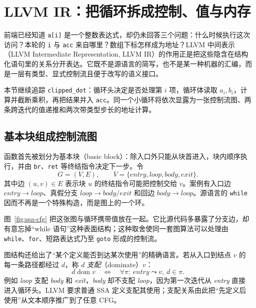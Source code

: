 \section{LLVM IR：把循环拆成控制、值与内存}
\label{sec:llvm-ir}

前端已经知道 \texttt{a[i]} 是一个整数表达式，却仍未回答三个问题：什么时候执行这次访问？本轮的 \texttt{i} 与 \texttt{acc} 来自哪里？数组下标怎样成为地址？LLVM 中间表示（LLVM Intermediate Representation, LLVM IR）的作用正是把这些隐含在结构化语句里的关系分开表达。它既不是源语言的简写，也不是某一种机器的汇编，而是一层有类型、显式控制流且便于改写的语义接口\cite{llvm-lattner2004,llvm-langref}。

本节继续追踪 \texttt{clipped\_dot}：循环头决定是否处理第 \(i\) 项，循环体读取 \(a_i,b_i\)，计算并截断乘积，再把结果并入 \texttt{acc}。同一个小循环将依次显露为一张控制流图、两条跨迭代的值递推和两次带类型步长的地址计算。

\subsection{基本块组成控制流图}

函数首先被划分为基本块（basic block）：除入口外只能从块首进入，块内顺序执行，并由 \texttt{br}、\texttt{ret} 等终结指令决定下一步。令
\[
  G=(V,E),\qquad
  V=\{\textit{entry},\textit{loop},\textit{body},\textit{exit}\}.
\]
其中边 \((u,v)\in E\) 表示块 \(u\) 的终结指令可能把控制交给 \(v\)。案例有入口边 \(entry\to loop\)、真假分支 \(loop\to body/exit\) 和回边 \(body\to loop\)。源语言的 \texttt{while} 因而不再是一个特殊构造，而是图上的一个环。

图~\ref{fig:ssa-cfg} 把这张图与循环携带值放在一起。它比源代码多暴露了分支边，却有意忘掉“while 语句”这种表面结构；这种取舍使同一套图算法可以处理由 \texttt{while}、\texttt{for}、短路表达式乃至 \texttt{goto} 形成的控制流。



图结构还给出了“某个定义能否到达某次使用”的精确语言。若从入口到结点 \(v\) 的每一条路径都经过 \(d\)，称 \(d\) \emph{支配}（dominate）\(v\)：
\begin{equation}
  d\mathrel{\operatorname{dom}} v
  \quad\Longleftrightarrow\quad
  \forall\pi:\ entry\leadsto v,\ d\in\pi .
  \label{eq:dominance}
\end{equation}
例如 \textit{loop} 支配 \textit{body} 和 \textit{exit}，\textit{body} 却不支配 \textit{loop}，因为第一次迭代从 \textit{entry} 直接进入循环头。LLVM 要求普通 SSA 定义支配其使用；支配关系由此把“先定义后使用”从文本顺序推广到了任意 CFG。

